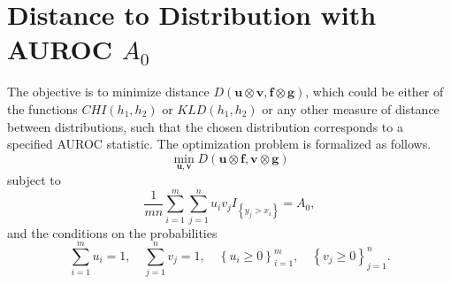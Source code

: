 

\section{Distance to Distribution with AUROC $A_0$} \label{app:soln}

The objective is to minimize distance
$D(\mathbf{u} \otimes \mathbf{v},\mathbf{f} \otimes \mathbf{g})$, which could be either of the functions $CHI(h_1, h_2)$ or $KLD(h_1, h_2)$ or any other measure of distance between distributions, such that the chosen distribution corresponds to a specified AUROC statistic.
%
The optimization problem is formalized as follows.
%
\begin{equation}
    \min_{\mathbf{u},\mathbf{v}}
        D(\mathbf{u} \otimes \mathbf{f}, \mathbf{v} \otimes \mathbf{g})
\end{equation}
\noindent subject to
\begin{equation}
    \frac{1}{m n} \sum_{i = 1}^{m} \sum_{j = 1}^{n} u_i v_j I_{\left\{ y_j > x_i \right\}} = A_0,
\end{equation}
\noindent and the conditions on the probabilities
\begin{equation}
    \sum_{i = 1}^{m} u_i = 1, \quad \sum_{j = 1}^{n} v_j = 1, \quad \left\{ u_i \geq 0 \right\}_{i=1}^{m}, \quad \left\{ v_j \geq 0 \right\}_{j=1}^{n}.
\end{equation}

